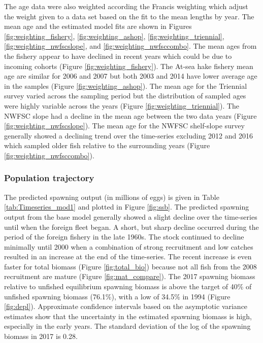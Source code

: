 \documentclass[12pt,]{article}
\begin{document}
The age data were also weighted according the Francis weighting which
adjust the weight given to a data set based on the fit to the mean
lengths by year. The mean age and the estimated model fits are shown in
Figures \ref{fig:weighting_fishery}, \ref{fig:weighting_ashop},
\ref{fig:weighting_triennial}, \ref{fig:weighting_nwfscslope}, and
\ref{fig:weighting_nwfsccombo}. The mean ages from the fishery appear to
have declined in recent years which could be due to incoming cohorts
(Figure \ref{fig:weighting_fishery}). The At-sea hake fishery mean age
are similar for 2006 and 2007 but both 2003 and 2014 have lower average
age in the samples (Figure \ref{fig:weighting_ashop}). The mean age for
the Triennial survey varied across the sampling period but the
distribution of sampled ages were highly variable across the years
(Figure \ref{fig:weighting_triennial}). The NWFSC slope had a decline in
the mean age between the two data years (Figure
\ref{fig:weighting_nwfscslope}). The mean age for the NWFSC shelf-slope
survey generally showed a declining trend over the time-series excluding
2012 and 2016 which sampled older fish relative to the surrounding years
(Figure \ref{fig:weighting_nwfsccombo}).

\subsubsection{Population trajectory}\label{population-trajectory}

The predicted spawning output (in millions of eggs) is given in Table
\ref{tab:Timeseries_mod1} and plotted in Figure \ref{fig:ssb}. The
predicted spawning output from the base model generally showed a slight
decline over the time-series until when the foreign fleet began. A
short, but sharp decline occurred during the period of the foreign
fishery in the late 1960s. The stock continued to decline minimally
until 2000 when a combination of strong recruitment and low catches
resulted in an increase at the end of the time-series. The recent
increase is even faster for total biomass (Figure \ref{fig:total_bio})
because not all fish from the 2008 recruitment are mature (Figure
\ref{fig:mat_compare}). The 2017 spawning biomass relative to unfished
equilibrium spawning biomass is above the target of 40\% of unfished
spawning biomass (76.1\%), with a low of 34.5\% in 1994 (Figure
\ref{fig:depl}). Approximate confidence intervals based on the
asymptotic variance estimates show that the uncertainty in the estimated
spawning biomass is high, especially in the early years. The standard
deviation of the log of the spawning biomass in 2017 is 0.28.
\end{document}
